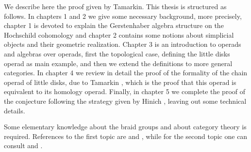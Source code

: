 \documentclass[TFM.tex]{subfiles}
\begin{document}
We describe here the proof given by Tamarkin. This thesis is structured as follows. In chapters 1 and 2 we give some necessary background, more precisely, chapter 1 is devoted to explain the Gerstenhaber algebra structure on the Hochschild cohomology and chapter 2 contains some notions about simplicial objects and their geometric realization. Chapter 3 is an introduction to operads and algebras over operads, first the topological case, defining the little disks operad as main example, and then we extend the definitions to more general categories. In chapter 4 we review in detail the proof of the formality of the chain operad of little disks, due to Tamarkin \cite{Tamarkin}, which is the proof that this operad is equivalent to its homology operad. Finally, in chapter 5 we complete the proof of the conjecture following the strategy given by Hinich \cite{Hinich}, leaving out some technical details. 

Some elementary knowledge about the braid groups and about category theory is required. References to the first topic are \cite{tfg} and \cite{Meneses}, while for the second topic one can consult \cite{working} and \cite{Diego}.




%
%
%
%
\end{document}

